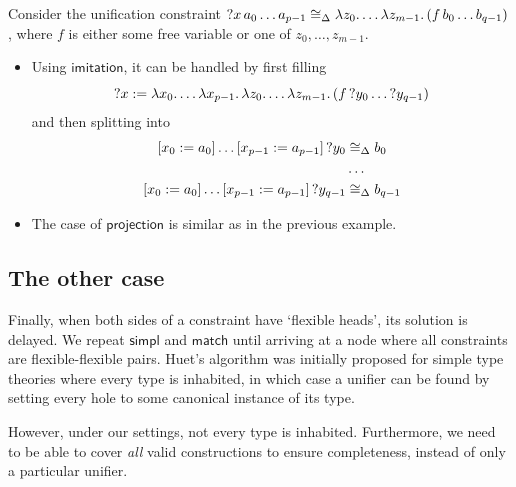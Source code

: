 \documentclass[twoside]{report}
\begin{document}
\begin{example}
    Consider the unification constraint ${{{?x}\,{a_0}}\,{\ldots}}\,{a_{p-1}} \cong_\Delta \lambda{z_0}.\,{\ldots \lambda{z_{m-1}}.\,{({{{f}\,{b_0}}\,{\ldots}}\,{b_{q-1}})}}$, where $f$ is either some free variable or one of $z_0, \ldots, z_{m-1}$.

    \begin{itemize}
        \item Using $\mathsf{imitation}$, it can be handled by first filling
              $$
                  {?x} :=
                  \lambda{x_0}.\,{\ldots \lambda{x_{p-1}}.\,{\lambda{z_0}.\,{\ldots \lambda{z_{m-1}}.\,{
                                  ({{f}\,{?y_0}}\,{\ldots {?y_{q-1}}})
                              }}}}
              $$
              and then splitting into
              $$
                  \begin{aligned}
                      \llet {x_0} {a_0} {\ldots \llet {x_{p-1}} {a_{p-1}} {?y_0}}     & \cong_\Delta b_0     \\
                                                                                      & \ldots               \\
                      \llet {x_0} {a_0} {\ldots \llet {x_{p-1}} {a_{p-1}} {?y_{q-1}}} & \cong_\Delta b_{q-1} \\
                  \end{aligned}
              $$

        \item The case of $\mathsf{projection}$ is similar as in the previous example.
    \end{itemize}
\end{example}

\subsection*{The other case}

Finally, when both sides of a constraint have `flexible heads', its solution is delayed. We repeat $\mathsf{simpl}$ and $\mathsf{match}$ until arriving at a node where all constraints are flexible-flexible pairs. Huet's algorithm was initially proposed for simple type theories where every type is inhabited, in which case a unifier can be found by setting every hole to some canonical instance of its type.

However, under our settings, not every type is inhabited. Furthermore, we need to be able to cover \emph{all} valid constructions to ensure completeness, instead of only a particular unifier.
\end{document}
